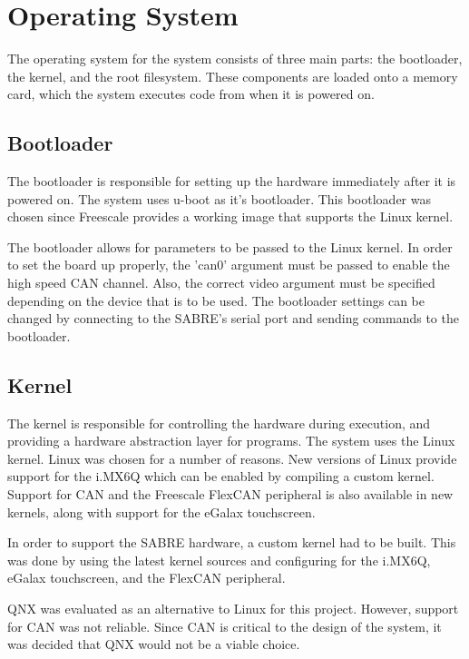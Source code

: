 \documentclass[ece]{uw-wkrpt}
\begin{document}
\section{Operating System}

The operating system for the system consists of three main parts: the
bootloader, the kernel, and the root filesystem. These components are loaded
onto a memory card, which the system executes code from when it is powered on.

\subsection{Bootloader}

The bootloader is responsible for setting up the hardware immediately after it
is powered on. The system uses u-boot as it's bootloader. This bootloader was
chosen since Freescale provides a working image that supports the Linux kernel.

The bootloader allows for parameters to be passed to the Linux kernel. In order
to set the board up properly, the 'can0' argument must be passed to enable the
high speed CAN channel. Also, the correct video argument must be specified
depending on the device that is to be used. The bootloader settings can be
changed by connecting to the SABRE's serial port and sending commands to the
bootloader.

\subsection{Kernel}

The kernel is responsible for controlling the hardware during execution, and
providing a hardware abstraction layer for programs. The system uses the Linux
kernel. Linux was chosen for a number of reasons. New versions of Linux provide
support for the i.MX6Q which can be enabled by compiling a custom kernel.
Support for CAN and the Freescale FlexCAN peripheral is also available in new
kernels, along with support for the eGalax touchscreen.

In order to support the SABRE hardware, a custom kernel had to be built. This
was done by using the latest kernel sources and configuring for the i.MX6Q,
eGalax touchscreen, and the FlexCAN peripheral.

QNX was evaluated as an alternative to Linux for this project. However, support
for CAN was not reliable. Since CAN is critical to the design of the system, it
was decided that QNX would not be a viable choice.
\end{document}
